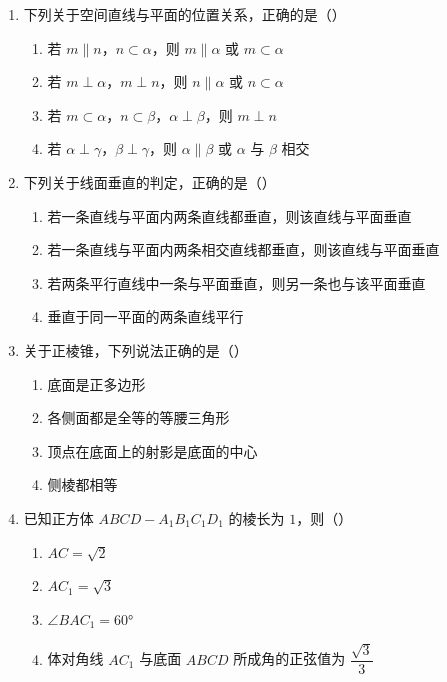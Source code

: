 \documentclass[12pt, a4paper]{ctexart}
\begin{document}
\begin{enumerate}[resume]
\item 下列关于空间直线与平面的位置关系，正确的是（\quad）
  \begin{enumerate}[label=\Alph*., itemsep=0pt]
    \item 若 $m\parallel n$，$n\subset\alpha$，则 $m\parallel\alpha$ 或 $m\subset\alpha$
    \item 若 $m\perp\alpha$，$m\perp n$，则 $n\parallel\alpha$ 或 $n\subset\alpha$
    \item 若 $m\subset\alpha$，$n\subset\beta$，$\alpha\perp\beta$，则 $m\perp n$
    \item 若 $\alpha\perp\gamma$，$\beta\perp\gamma$，则 $\alpha\parallel\beta$ 或 $\alpha$ 与 $\beta$ 相交
  \end{enumerate}

\item 下列关于线面垂直的判定，正确的是（\quad）
  \begin{enumerate}[label=\Alph*., itemsep=0pt]
    \item 若一条直线与平面内两条直线都垂直，则该直线与平面垂直
    \item 若一条直线与平面内两条相交直线都垂直，则该直线与平面垂直
    \item 若两条平行直线中一条与平面垂直，则另一条也与该平面垂直
    \item 垂直于同一平面的两条直线平行
  \end{enumerate}

\item 关于正棱锥，下列说法正确的是（\quad）
  \begin{enumerate}[label=\Alph*., itemsep=0pt]
    \item 底面是正多边形
    \item 各侧面都是全等的等腰三角形
    \item 顶点在底面上的射影是底面的中心
    \item 侧棱都相等
  \end{enumerate}

\item 已知正方体 $ABCD-A_1B_1C_1D_1$ 的棱长为 $1$，则（\quad）
  \begin{enumerate}[label=\Alph*., itemsep=0pt]
    \item $AC=\sqrt{2}$
    \item $AC_1=\sqrt{3}$
    \item $\angle BAC_1=60°$
    \item 体对角线 $AC_1$ 与底面 $ABCD$ 所成角的正弦值为 $\dfrac{\sqrt{3}}{3}$
  \end{enumerate}
\end{enumerate}
\end{document}
